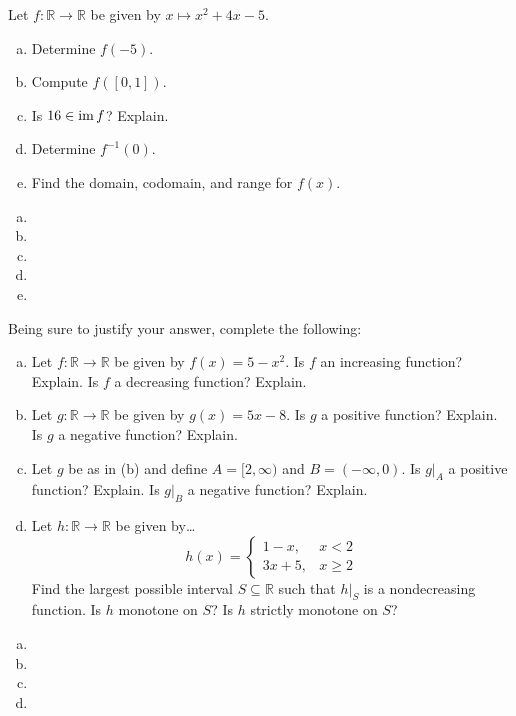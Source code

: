 \documentclass[11pt,letterpaper]{article}
\begin{document}
 Let $f: \mathbb{R} \to \mathbb{R}$ be given by $x \mapsto x^2 + 4x - 5$.
	\begin{enumerate}[(a)]
	\item Determine $f(-5)$.
	\item Compute $f([0,1])$.
	\item Is $16 \in \operatorname{im} f$? Explain. 
	\item Determine $f^{-1}(0)$.
	\item Find the domain, codomain, and range for $f(x)$. 
	\end{enumerate} \pspace

\sol 
\begin{enumerate}[(a)]
\item 
\item 
\item 
\item 
\item 
\end{enumerate}



\newpage



 Being sure to justify your answer, complete the following:
	\begin{enumerate}[(a)]
	\item Let $f: \mathbb{R} \to \mathbb{R}$ be given by $f(x)= 5 - x^2$. Is $f$ an increasing function? Explain. Is $f$ a decreasing function? Explain. 
	\item Let $g: \mathbb{R} \to \mathbb{R}$ be given by $g(x)= 5x - 8$. Is $g$ a positive function? Explain. Is $g$ a negative function? Explain. 
	\item Let $g$ be as in (b) and define $A= [2, \infty)$ and $B= (-\infty, 0)$. Is $g \big|_A$ a positive function? Explain. Is $g \big|_B$ a negative function? Explain. 
	\item Let $h: \mathbb{R} \to \mathbb{R}$ be given by\dots
		\[
		h(x)= 
		\begin{cases}
		1 - x, & x < 2 \\
		3x + 5, & x \geq 2
		\end{cases}
		\]
	Find the largest possible interval $S \subseteq \mathbb{R}$ such that $h \big|_S$ is a nondecreasing function. Is $h$ monotone on $S$? Is $h$ strictly monotone on $S$?
	\end{enumerate} \pspace

\sol 
\begin{enumerate}[(a)]
\item 
\item 
\item 
\item 
\end{enumerate}
\end{document}

